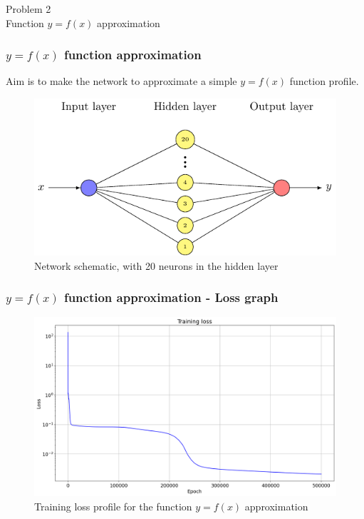 \begin{frame}
    \centering
     Problem 2 \\ \vspace{1cm}  Function \(y = f(x)\) approximation
\end{frame}

\begin{frame}
    \frametitle{$y=f(x)$ function approximation}
    Aim is to make the network to approximate a simple $y = f(x)$ function profile.
    \vspace{0.25cm}
    \begin{figure}
        \center
        \includegraphics[scale=1]{supportingFiles/schematics/XY_problem/XY_schematic.pdf}
        \caption{Network schematic, with 20 neurons in the hidden layer}
    \end{figure}
\end{frame}

\begin{frame}
    \frametitle{$y=f(x)$ function approximation - Loss graph}
    \begin{figure}
        \center
        \includegraphics[scale=0.33]{supportingFiles/lossGraphs/loss_XY.png}
        \caption{Training loss profile for the function $y=f(x)$ approximation}
    \end{figure}
\end{frame}

